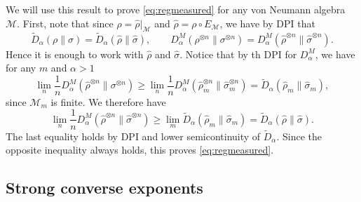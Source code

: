 \documentclass[12pt]{article}
\theoremstyle{definition}
\theoremstyle{remark}
\def\Me{\mathcal M}
\begin{document}
We will use this result to prove \eqref{eq:regmeasured} for any von Neumann algebra $\Me$. 
First, note that since $\rho=\hat\rho|_\Me$ and $\hat\rho=\rho\circ E_\Me$, we have by DPI
that 
\[
\tilde D_\alpha(\rho\|\sigma)=\tilde D_\alpha(\hat\rho\|\hat\sigma),\qquad
D^M_\alpha(\rho^{\otimes n}\|\sigma^{\otimes n})=D^M_\alpha(\hat\rho^{\otimes
n}\|\hat\sigma^{\otimes n}).
\]
Hence it is enough to work with $\hat\rho$ and $\hat\sigma$. Notice that by th DPI for
$D^M_\alpha$, we have for any $m$ and $\alpha>1$ 
\[
\lim_n \frac 1n D^M_\alpha(\hat \rho^{\otimes n}\|\sigma^{\otimes n})\ge
\lim_n\frac1nD_\alpha^M(\hat\rho_m^{\otimes n}\|\hat\sigma_m^{\otimes n})=\tilde
D_\alpha(\hat\rho_m\|\hat\sigma_m),
\]
since $\Me_m$ is finite. We therefore have 
\[
\lim_n \frac 1n D^M_\alpha(\hat \rho^{\otimes n}\|\hat \sigma^{\otimes n})\ge \lim_m \tilde
D_\alpha (\hat\rho_m\|\hat\sigma_m)=\tilde
D_\alpha (\hat\rho\|\hat\sigma).
\]
The last equality holds by DPI and lower semicontinuity of $\tilde D_\alpha$. Since the
opposite inequality always holds, this proves \eqref{eq:regmeasured}.

\subsection{Strong converse exponents} 
\end{document}
